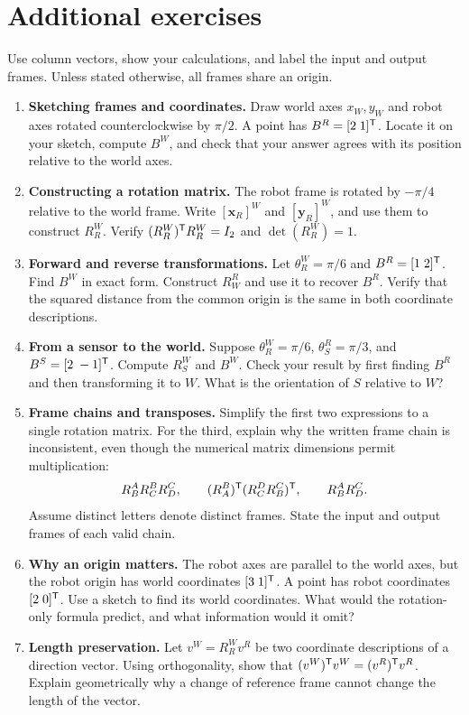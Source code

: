 \section{Additional exercises}
Use column vectors, show your calculations, and label the input and output
frames. Unless stated otherwise, all frames share an origin.
\begin{enumerate}
\item \textbf{Sketching frames and coordinates.}
Draw world axes $x_W,y_W$ and robot axes rotated counterclockwise by $\pi/2$.
A point has $B^R=[2\;1]^{\mathsf T}$. Locate it on your sketch, compute $B^W$,
and check that your answer agrees with its position relative to the world axes.

\item \textbf{Constructing a rotation matrix.}
The robot frame is rotated by $-\pi/4$ relative to the world frame. Write
$[\boldsymbol{x}_R]^W$ and $[\boldsymbol{y}_R]^W$, and use them to construct
$R_R^W$. Verify $(R_R^W)^{\mathsf T} R_R^W=I_2$ and $\det(R_R^W)=1$.

\item \textbf{Forward and reverse transformations.}
Let $\theta_R^W=\pi/6$ and $B^R=[1\;2]^{\mathsf T}$. Find $B^W$ in exact form.
Construct $R_W^R$ and use it to recover $B^R$. Verify that the squared distance
from the common origin is the same in both coordinate descriptions.

\item \textbf{From a sensor to the world.}
Suppose $\theta_R^W=\pi/6$, $\theta_S^R=\pi/3$, and
$B^S=[2\;-1]^{\mathsf T}$. Compute $R_S^W$ and $B^W$. Check your result by first
finding $B^R$ and then transforming it to $W$. What is the orientation of $S$
relative to $W$?

\item \textbf{Frame chains and transposes.}
Simplify the first two expressions to a single rotation matrix. For the third,
explain why the written frame chain is inconsistent, even though the numerical
matrix dimensions permit multiplication:
\[
 R_B^A R_C^B R_D^C,\qquad
 (R_A^B)^{\mathsf T} (R_C^D R_B^C)^{\mathsf T},\qquad
 R_B^A R_D^C.
\]
Assume distinct letters denote distinct frames. State the input and output
frames of each valid chain.

\item \textbf{Why an origin matters.}
The robot axes are parallel to the world axes, but the robot origin has world
coordinates $[3\;1]^{\mathsf T}$. A point has robot coordinates $[2\;0]^{\mathsf T}$.
Use a sketch to find its world coordinates. What would the rotation-only
formula predict, and what information would it omit?

\item \textbf{Length preservation.}
Let $v^W=R_R^W v^R$ be two coordinate descriptions of a direction vector.
Using orthogonality, show that $(v^W)^{\mathsf T} v^W=(v^R)^{\mathsf T} v^R$.
Explain geometrically why a change of reference frame cannot change the
length of the vector.
\end{enumerate}
